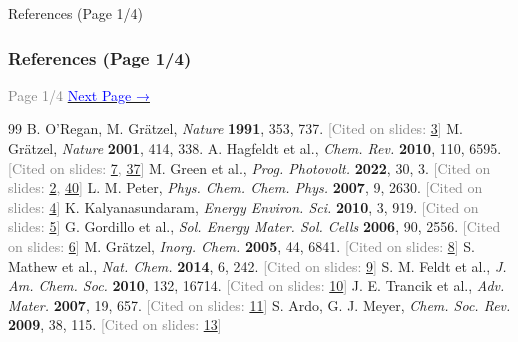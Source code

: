 \documentclass[aspectratio=169]{beamer}
\begin{document}
\begin{frame}[allowframebreaks]{References (Page 1/4)}
\frametitle{References (Page 1/4)}
\vspace{0.5em}\begin{center}\textcolor{gray}{\small Page 1/4} \hfill \hyperlink{page.2}{\textcolor{blue}{\small Next Page →}}\end{center}

\begin{thebibliography}{99}
 B. O'Regan, M. Grätzel, \textit{Nature} \textbf{1991}, 353, 737. \hfill\textcolor{gray}{\tiny [Cited on slides: \hyperlink{page.3}{3}]}
 M. Grätzel, \textit{Nature} \textbf{2001}, 414, 338.
 A. Hagfeldt et al., \textit{Chem. Rev.} \textbf{2010}, 110, 6595. \hfill\textcolor{gray}{\tiny [Cited on slides: \hyperlink{page.7}{7}, \hyperlink{page.37}{37}]}
 M. Green et al., \textit{Prog. Photovolt.} \textbf{2022}, 30, 3. \hfill\textcolor{gray}{\tiny [Cited on slides: \hyperlink{page.2}{2}, \hyperlink{page.40}{40}]}
 L. M. Peter, \textit{Phys. Chem. Chem. Phys.} \textbf{2007}, 9, 2630. \hfill\textcolor{gray}{\tiny [Cited on slides: \hyperlink{page.4}{4}]}
 K. Kalyanasundaram, \textit{Energy Environ. Sci.} \textbf{2010}, 3, 919. \hfill\textcolor{gray}{\tiny [Cited on slides: \hyperlink{page.5}{5}]}
 G. Gordillo et al., \textit{Sol. Energy Mater. Sol. Cells} \textbf{2006}, 90, 2556. \hfill\textcolor{gray}{\tiny [Cited on slides: \hyperlink{page.6}{6}]}
 M. Grätzel, \textit{Inorg. Chem.} \textbf{2005}, 44, 6841. \hfill\textcolor{gray}{\tiny [Cited on slides: \hyperlink{page.8}{8}]}
 S. Mathew et al., \textit{Nat. Chem.} \textbf{2014}, 6, 242. \hfill\textcolor{gray}{\tiny [Cited on slides: \hyperlink{page.9}{9}]}
 S. M. Feldt et al., \textit{J. Am. Chem. Soc.} \textbf{2010}, 132, 16714. \hfill\textcolor{gray}{\tiny [Cited on slides: \hyperlink{page.10}{10}]}
 J. E. Trancik et al., \textit{Adv. Mater.} \textbf{2007}, 19, 657. \hfill\textcolor{gray}{\tiny [Cited on slides: \hyperlink{page.11}{11}]}
 S. Ardo, G. J. Meyer, \textit{Chem. Soc. Rev.} \textbf{2009}, 38, 115. \hfill\textcolor{gray}{\tiny [Cited on slides: \hyperlink{page.13}{13}]}
\end{thebibliography}
\end{frame}
\end{document}
